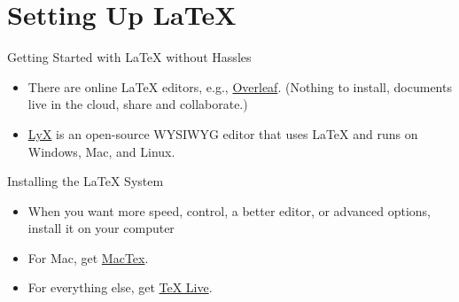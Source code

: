 \section{Setting Up \LaTeX}


\begin{frame}{Getting Started with \LaTeX{} without Hassles}

\begin{itemize}
\item There are online \LaTeX{} editors, e.g.,
\href{https://www.overleaf.com/}{Overleaf}.
(Nothing to install, documents live in the cloud, share and collaborate.)
\item \href{http://www.lyx.org/}{LyX} is an open-source WYSIWYG editor
  that uses \LaTeX{} and runs on Windows, Mac, and Linux.
\end{itemize}

\end{frame}

\begin{frame}{Installing the \LaTeX{} System}

\begin{itemize}
\item When you want more speed, control, a better editor, or advanced 
options, install it on your computer
\item For Mac, get \href{http://www.tug.org/mactex/}{MacTex}.
\item For everything else, get \href{http://www.tug.org/texlive/}{TeX Live}.
\end{itemize}

\end{frame}

